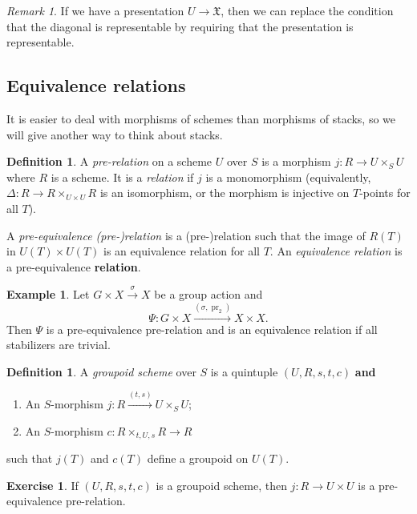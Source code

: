 \documentclass{amsart}
\theoremstyle{definition}
\newtheorem{defn}[thm]{Definition}
\newtheorem{exm}[thm]{Example}
\newtheorem{exer}[thm]{Exercise}
\theoremstyle{remark}
\newtheorem{rmk}[thm]{Remark}
\theoremstyle{plain}
\theoremstyle{definition}
\theoremstyle{remark}
\newcommand{\mf}[1]{\mathfrak{#1}}
\newcommand{\on}[1]{\operatorname{#1}}
\newcommand{\1}{\mathbf{1}}
\newcommand{\2}{\mathbf{2}}
\newcommand{\3}{\mathbf{3}}
\begin{document}
\begin{rmk}
    If we have a presentation \(U \to \mf{X}\), then we can replace the condition that the diagonal is representable by requiring that the presentation is representable.
\end{rmk}

\subsection{Equivalence relations}%
\label{sub:Equivalence relations}

It is easier to deal with morphisms of schemes than morphisms of stacks, so we will give another way to think about stacks.

\begin{defn}
    A \textit{pre-relation} on a scheme \(U\) over \(S\) is a morphism \(j \colon R \to U \times_S U\) where \(R\) is a scheme. It is a \textit{relation} if \(j\) is a monomorphism (equivalently, \(\Delta \colon R \to R \times_{U \times U} R\) is an isomorphism, or the morphism is injective on \(T\)-points for all \(T\)).

    A \textit{pre-equivalence (pre-)relation} is a (pre-)relation such that the image of \(R(T)\) in \(U(T) \times U(T)\) is an equivalence relation for all \(T\). An \textit{equivalence relation} is a pre-equivalence \textbf{relation}.
\end{defn}

\begin{exm}
    Let \(G \times X \xrightarrow{\sigma} X\) be a group action and
    \[ \Psi \colon G \times X \xrightarrow{(\sigma, \on{pr}_2)} X \times X. \]
    Then \(\Psi\) is a pre-equivalence pre-relation and is an equivalence relation if all stabilizers are trivial.
\end{exm}

\begin{defn}
    A \textit{groupoid scheme} over \(S\) is a quintuple \((U, R, s, t, c)\) \textbf{and}
    \begin{enumerate}
        \item An \(S\)-morphism \(j \colon R \xrightarrow{(t,s)} U \times_S U\);
        \item An \(S\)-morphism \(c \colon R \times_{t,U,s} R \to R\)
    \end{enumerate}
    such that \(j(T)\) and \(c(T)\) define a groupoid on \(U(T)\).
\end{defn}

\begin{exer}
    If \((U, R, s,t,c)\) is a groupoid scheme, then \(j \colon R \to U \times U\) is a pre-equivalence pre-relation.
\end{exer}
\end{document}
